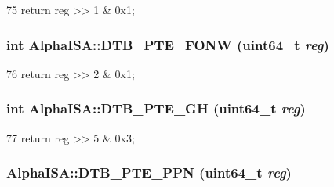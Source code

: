 \begin{DoxyCode}
75 { return reg >> 1 & 0x1; }
\end{DoxyCode}
\hypertarget{namespaceAlphaISA_a32962f01b9ce7d53ebea64779cb769ba}{
\subsubsection[{DTB\_\-PTE\_\-FONW}]{\setlength{\rightskip}{0pt plus 5cm}int AlphaISA::DTB\_\-PTE\_\-FONW (uint64\_\-t {\em reg})}}
\label{namespaceAlphaISA_a32962f01b9ce7d53ebea64779cb769ba}



\begin{DoxyCode}
76 { return reg >> 2 & 0x1; }
\end{DoxyCode}
\hypertarget{namespaceAlphaISA_a4d5fad955e0b9ccad5b4e7d7820fa01c}{
\subsubsection[{DTB\_\-PTE\_\-GH}]{\setlength{\rightskip}{0pt plus 5cm}int AlphaISA::DTB\_\-PTE\_\-GH (uint64\_\-t {\em reg})}}
\label{namespaceAlphaISA_a4d5fad955e0b9ccad5b4e7d7820fa01c}



\begin{DoxyCode}
77 { return reg >> 5 & 0x3; }
\end{DoxyCode}
\hypertarget{namespaceAlphaISA_a0f147507d2a1a5437426ab7231e4a3d5}{
\subsubsection[{DTB\_\-PTE\_\-PPN}]{ AlphaISA::DTB\_\-PTE\_\-PPN (uint64\_\-t {\em reg})}}
\label{namespaceAlphaISA_a0f147507d2a1a5437426ab7231e4a3d5}



